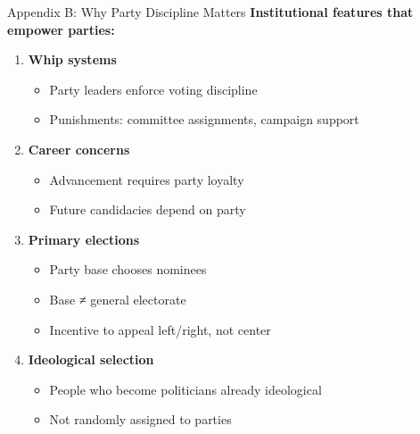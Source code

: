 \documentclass[10pt]{beamer}
\begin{document}
\begin{frame}{Appendix B: Why Party Discipline Matters}
\textbf{Institutional features that empower parties:}

\begin{enumerate}
\item \textbf{Whip systems}
\begin{itemize}
\item Party leaders enforce voting discipline
\item Punishments: committee assignments, campaign support
\end{itemize}

\item \textbf{Career concerns}
\begin{itemize}
\item Advancement requires party loyalty
\item Future candidacies depend on party
\end{itemize}

\item \textbf{Primary elections}
\begin{itemize}
\item Party base chooses nominees
\item Base ≠ general electorate
\item Incentive to appeal left/right, not center
\end{itemize}

\item \textbf{Ideological selection}
\begin{itemize}
\item People who become politicians already ideological
\item Not randomly assigned to parties
\end{itemize}
\end{enumerate}


\small{\hyperlink{challenge-2}{}}
\end{frame}
\end{document}
